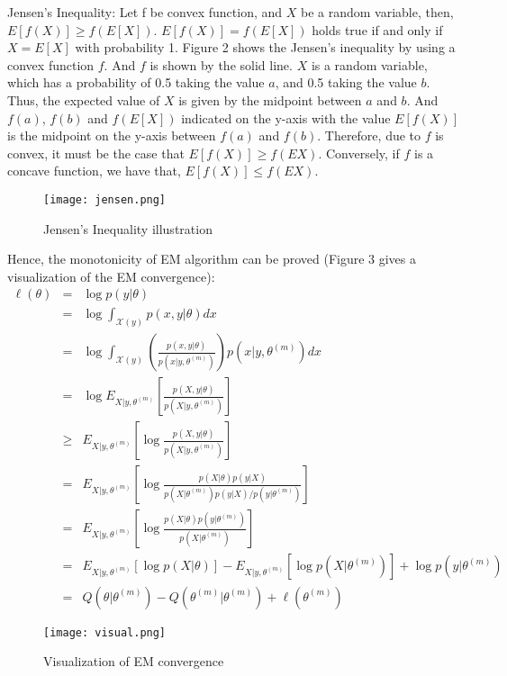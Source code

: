 \documentclass[onecolumn,12pt]{IEEEtran}
\begin{document}
Jensen’s Inequality: Let f be convex function, and $X$ be a random variable, then, $E[f(X)] \geq f(E[X])$. $E[f(X)] = f(E[X])$ holds true if and only if $X = E[X]$ with probability 1.
Figure 2 shows the Jensen’s inequality by using a convex function $f$. And $f$ is shown by the solid line. $X$ is a random variable, which has a probability of 0.5 taking the value $a$, and 0.5 taking the value $b$. Thus, the expected value of $X$ is given by the midpoint between $a$ and $b$. And $f(a)$, $f(b)$ and $f(E[X])$ indicated on the y-axis with the value $E[f(X)]$ is the midpoint on the y-axis between $f(a)$ and $f(b)$. Therefore, due to $f$ is convex, it must be the case that $E[f(X)] \geq f(EX)$. Conversely, if $f$ is a concave function, we have that, $E[f(X)] \leq f(EX)$.

\begin{figure}[!htb]
  \centering
  \texttt{[image: jensen.png]}
  \caption{Jensen’s Inequality illustration}
\end{figure}

Hence, the monotonicity of EM algorithm can be proved (Figure 3 gives a visualization of the EM convergence):
\begin{eqnarray}
  \ell(\theta) & = & \log p(y|\theta) \nonumber\\
  & = & \log\int_{\mathcal{X}(y)} p(x,y|\theta)dx \nonumber\\
  & = & \log\int_{\mathcal{X}(y)} (\frac{p(x,y|\theta)}{p(x|y,\theta^{(m)})}) p(x|y,\theta^{(m)})dx \\
  & = & \log E_{X|y,\theta^{(m)}}\left[\frac{p(X,y|\theta)}{p(X|y,\theta^{(m)})}\right] \nonumber\\
  & \geq & E_{X|y,\theta^{(m)}}\left[\log\frac{p(X,y|\theta)}{p(X|y,\theta^{(m)})}\right] \nonumber\\
  & = & E_{X|y,\theta^{(m)}}\left[\log\frac{p(X|\theta)p(y|X)}{p(X|\theta^{(m)})p(y|X)/p(y|\theta^{(m)})}\right] \nonumber\\
  & = & E_{X|y,\theta^{(m)}}\left[\log\frac{p(X|\theta)p(y|\theta^{(m)})}{p(X|\theta^{(m)})}\right] \nonumber\\
  & = & E_{X|y,\theta^{(m)}}[\log p(X|\theta)] - E_{X|y,\theta^{(m)}}[\log p(X|\theta^{(m)})] + \log p(y|\theta^{(m)}) \nonumber\\
  & = & Q(\theta|\theta^{(m)}) - Q(\theta^{(m)}|\theta^{(m)}) + \ell(\theta^{(m)})
\end{eqnarray}

\begin{figure}[!htb]
  \centering
  \texttt{[image: visual.png]}
  \caption{Visualization of EM convergence}
\end{figure}
\end{document}
